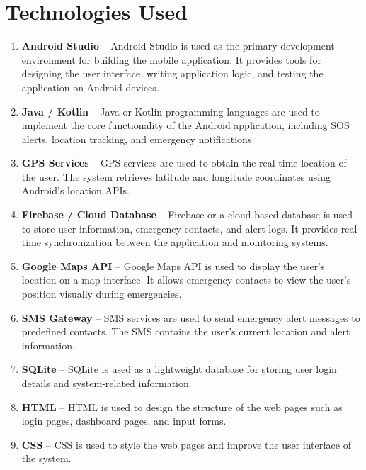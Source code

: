 \documentclass[a4paper,12pt]{report}
\begin{document}
\section{Technologies Used}

\begin{enumerate}

\item \textbf{Android Studio} – Android Studio is used as the primary development environment for building the mobile application. It provides tools for designing the user interface, writing application logic, and testing the application on Android devices.

\item \textbf{Java / Kotlin} – Java or Kotlin programming languages are used to implement the core functionality of the Android application, including SOS alerts, location tracking, and emergency notifications.

\item \textbf{GPS Services} – GPS services are used to obtain the real-time location of the user. The system retrieves latitude and longitude coordinates using Android’s location APIs.

\item \textbf{Firebase / Cloud Database} – Firebase or a cloud-based database is used to store user information, emergency contacts, and alert logs. It provides real-time synchronization between the application and monitoring systems.

\item \textbf{Google Maps API} – Google Maps API is used to display the user’s location on a map interface. It allows emergency contacts to view the user’s position visually during emergencies.

\item \textbf{SMS Gateway} – SMS services are used to send emergency alert messages to predefined contacts. The SMS contains the user’s current location and alert information.

\item \textbf{SQLite} – SQLite is used as a lightweight database for storing user login details and system-related information.

\item \textbf{HTML} – HTML is used to design the structure of the web pages such as login pages, dashboard pages, and input forms.

\item \textbf{CSS} – CSS is used to style the web pages and improve the user interface of the system.


\end{enumerate}
\end{document}
